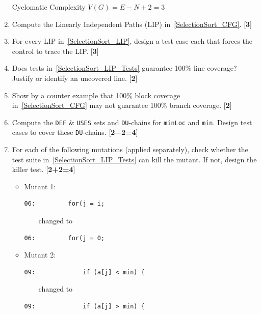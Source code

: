 \documentclass{article}
\begin{document}
\begin{enumerate}
\begin{framed}
Cyclomatic Complexity $V(G) = E - N + 2 = 3$
\end{framed}
\item \label{SelectionSort_LIP} Compute the Linearly Independent Paths (LIP) in~\ref{SelectionSort_CFG}. [{\bf 3}]
\item \label{SelectionSort_LIP_Tests} For every LIP in~\ref{SelectionSort_LIP}, design a test case each that forces the control to trace the LIP. [{\bf 3}]
\item \label{SelectionSort_Block_Coverage} Does tests in~\ref{SelectionSort_LIP_Tests} guarantee 100\% line coverage? Justify or identify an uncovered line. [{\bf 2}]
\item Show by a counter example that 100\% block coverage in~\ref{SelectionSort_CFG} may not guarantee 100\% branch coverage. [{\bf 2}]
\item \label{SelectionSort_DEF_USES} Compute the \texttt{DEF} \& \texttt{USES} sets and \texttt{DU}-chains for \texttt{minLoc} and \texttt{min}. Design test cases to cover these \texttt{DU}-chains. [{\bf 2+2=4}]
\item For each of the following mutations (applied separately), check whether the test suite in~\ref{SelectionSort_LIP_Tests} can kill the mutant. If not, design the killer test. [{\bf 2+2=4}]
\begin{itemize}
\item Mutant 1:
\begin{verbatim}
06:         for(j = i;
\end{verbatim}
\ \ \ \ changed to 
\begin{verbatim}
06:         for(j = 0;
\end{verbatim}
\item Mutant 2:
\begin{verbatim}
09:             if (a[j] < min) {
\end{verbatim}
\ \ \ \ changed to 
\begin{verbatim}
09:             if (a[j] > min) {
\end{verbatim}
\end{itemize}

\end{enumerate}
\end{document}
